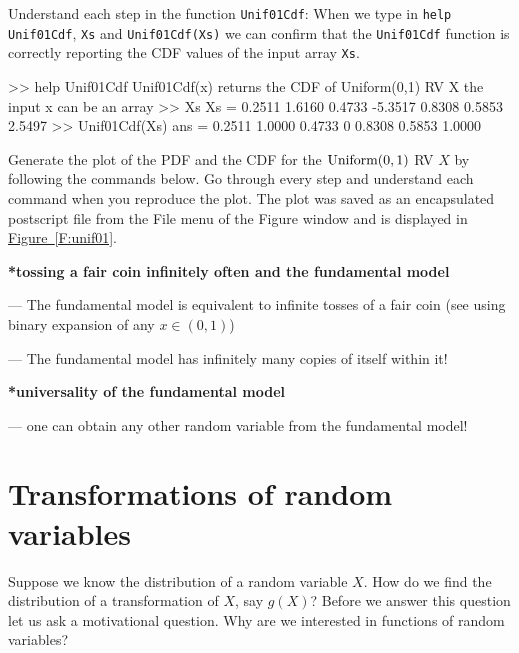 {\begin{labwork}\label{LW:Unif01Cdf}
Understand each step in the function {\tt Unif01Cdf}:
When we type in {\tt help Unif01Cdf}, {\tt Xs} and {\tt Unif01Cdf(Xs)} we can confirm that the {\tt Unif01Cdf} function is correctly reporting the CDF values of the input array {\tt Xs}.
\begin{VrbM}
>> help Unif01Cdf
  Unif01Cdf(x) returns the CDF of Uniform(0,1) RV X
  the input x can be an array 
>> Xs
Xs =    0.2511    1.6160    0.4733   -5.3517    0.8308    0.5853    2.5497
>> Unif01Cdf(Xs)
ans =    0.2511    1.0000    0.4733         0    0.8308    0.5853    1.0000
\end{VrbM}
\end{labwork}

\begin{labwork}\label{LW:PlotUnif01PdfCdf}
Generate the plot of the PDF and the CDF for the $\mbox{{\rm Uniform}}(0,1)$ RV $X$ by following the commands below.  Go through every step and understand each command when you reproduce the plot.
The plot was saved as an encapsulated postscript file from the File menu of the Figure window and is displayed in \hyperref[F:unif01]{Figure~\ref*{F:unif01}}.
 \end{labwork}
}

{\bf **tossing a fair coin infinitely often and the fundamental model}


--- The fundamental model is equivalent to infinite tosses of a fair coin (see using binary expansion of any $x \in (0,1)$)

--- The fundamental model has infinitely many copies of itself within it!


{\bf **universality of the fundamental model}

--- one can obtain any other random variable from the fundamental model!

\section{Transformations of random variables}\label{S:TransformationsOFRvs}

Suppose we know the distribution of a random variable $X$.  How do we find the distribution of a transformation of $X$, say $g(X)$?
Before we answer this question let us ask a motivational question.  Why are we interested in functions of random variables?

